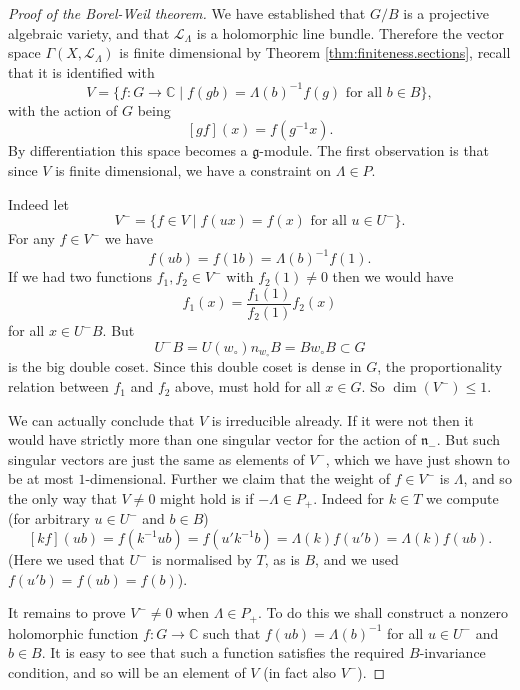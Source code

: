 \documentclass[12pt]{article}
\theoremstyle{plain}
\theoremstyle{definition}
\numberwithin{equation}{section}
\newcommand{\La}{\Lambda}
\newcommand{\C}{\mathbb{C}}
\newcommand{\g}{\mathfrak{g}}
\newcommand{\n}{\mathfrak{n}}
\newcommand{\CL}{\mathcal{L}}
\begin{document}
\begin{proof}[Proof of the Borel-Weil theorem]
We have established that $G/B$ is a projective algebraic variety, and that $\CL_\Lambda$ is a holomorphic line bundle. Therefore the vector space $\Gamma(X, \CL_\La)$ is finite dimensional by Theorem \ref{thm:finiteness.sections}, recall that it is identified with
\[
V = \{f : G \rightarrow \C \mid \text{$f(gb) = \Lambda(b)^{-1} f(g)$ for all $b \in B$}\},
\]
with the action of $G$ being
\[
[gf](x) = f(g^{-1}x).
\]
By differentiation this space becomes a $\g$-module. The first observation is that since $V$ is finite dimensional, we have a constraint on $\Lambda \in P$.

Indeed let
\[
V^- = \{f \in V \mid \text{$f(ux) = f(x)$ for all $u \in U^-$}\}.
\]
For any $f \in V^-$ we have
\[
f(ub) = f(1b) = \Lambda(b)^{-1}f(1).
\]
If we had two functions $f_1, f_2 \in V^-$ with $f_2(1) \neq 0$ then we would have
\[
f_1(x) = \frac{f_1(1)}{f_2(1)} f_2(x)
\]
for all $x \in U^-B$. But
\[
U^-B = U(w_\circ) n_{w_\circ} B = B w_\circ B \subset G
\]
is the big double coset. Since this double coset is dense in $G$, the proportionality relation between $f_1$ and $f_2$ above, must hold for all $x \in G$.  So $\dim(V^-) \leq 1$.


We can actually conclude that $V$ is irreducible already. If it were not then it would have strictly more than one singular vector for the action of $\n_-$. But such singular vectors are just the same as elements of $V^-$, which we have just shown to be at most $1$-dimensional. Further we claim that the weight of $f \in V^-$ is $\La$, and so the only way that $V \neq 0$ might hold is if $-\La \in P_+$. Indeed for $k \in T$ we compute (for arbitrary $u \in U^-$ and $b \in B$)
\[
[kf](u b) = f(k^{-1}ub) = f(u' k^{-1} b) = \Lambda(k) f(u' b) = \Lambda(k) f(u b).
\]
(Here we used that $U^-$ is normalised by $T$, as is $B$, and we used $f(u'b) = f(ub) = f(b)$).


It remains to prove $V^- \neq 0$ when $\Lambda \in P_+$. To do this we shall construct a nonzero holomorphic function $f : G \rightarrow \C$ such that $f(ub) = \Lambda(b)^{-1}$ for all $u \in U^-$ and $b \in B$. It is easy to see that such a function satisfies the required $B$-invariance condition, and so will be an element of $V$ (in fact also $V^-$).


\end{proof}
\end{document}
